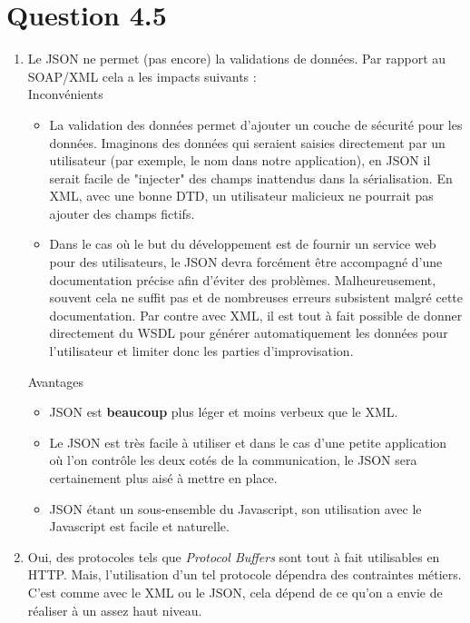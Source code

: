 \documentclass[12pt]{article}
\begin{document}
\section*{Question 4.5}

\begin{enumerate}[leftmargin=*, label=\alph*)]
\item Le JSON ne permet (pas encore) la validations de données. Par rapport au SOAP/XML cela a les impacts suivants : \\

\textcolor{pred}{Inconvénients}

\begin{itemize}
\item La validation des données permet d'ajouter un couche de sécurité pour les données. Imaginons des données qui seraient saisies directement par un utilisateur (par exemple, le nom dans notre application), en JSON il serait facile de "injecter" des champs inattendus dans la sérialisation. En XML, avec une bonne DTD, un utilisateur malicieux ne pourrait pas ajouter des champs fictifs.

\item Dans le cas où le but du développement est de fournir un service web pour des utilisateurs, le JSON devra forcément être accompagné d'une documentation précise afin d'éviter des problèmes. Malheureusement, souvent cela ne suffit pas et de nombreuses erreurs subsistent malgré cette documentation. Par contre avec XML, il est tout à fait possible de donner directement du WSDL pour générer automatiquement les données pour l'utilisateur et limiter donc les parties d'improvisation. \\
\end{itemize}

\textcolor{pgreen}{Avantages}

\begin{itemize}
\item JSON est \textbf{beaucoup} plus léger et moins verbeux que le XML.
\item Le JSON est très facile à utiliser et dans le cas d'une petite application où l'on contrôle les deux cotés de la communication, le JSON sera certainement plus aisé à mettre en place.
\item JSON étant un sous-ensemble du Javascript, son utilisation avec le Javascript est facile et naturelle. \\
\end{itemize}

\item Oui, des protocoles tels que \emph{Protocol Buffers} sont tout à fait utilisables en HTTP. Mais, l'utilisation d'un tel protocole dépendra des contraintes métiers. C'est comme avec le XML ou le JSON, cela dépend de ce qu'on a envie de réaliser à un assez haut niveau.


\end{enumerate}
\end{document}
